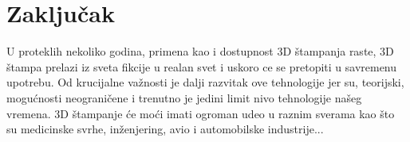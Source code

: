 \documentclass[a4paper]{article}
\begin{document}
\section{Zaključak}
\label{sec:Zaključak}

U proteklih nekoliko godina, primena kao i dostupnost 3D štampanja raste, 3D štampa prelazi iz sveta fikcije u realan svet i uskoro ce se pretopiti u savremenu upotrebu. Od krucijalne važnosti je dalji razvitak ove tehnologije jer su, teorijski, mogućnosti neograničene i trenutno je jedini limit nivo tehnologije našeg vremena. 3D štampanje će moći imati ogroman udeo u raznim sverama kao što su medicinske svrhe, inženjering, avio i automobilske industrije...
\newpage
 

% 
%











\end{document}
